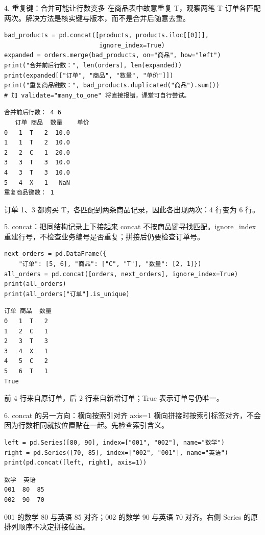 \documentclass[9pt]{ctexbeamer}
\begin{document}
\begin{frame}[fragile]{4. 重复键：合并可能让行数变多}
\small 在商品表中故意重复 T，观察两笔 T 订单各匹配两次。解决方法是核实键与版本，而不是合并后随意去重。
\medskip
\begin{lstlisting}[basicstyle=\ttfamily\scriptsize]
bad_products = pd.concat([products, products.iloc[[0]]],
                          ignore_index=True)
expanded = orders.merge(bad_products, on="商品", how="left")
print("合并前后行数：", len(orders), len(expanded))
print(expanded[["订单", "商品", "数量", "单价"]])
print("重复商品键数：", bad_products.duplicated("商品").sum())
# 加 validate="many_to_one" 将直接报错，课堂可自行尝试。
\end{lstlisting}
\begin{lstlisting}[language={},numbers=none,basicstyle=\ttfamily\scriptsize]
合并前后行数： 4 6
   订单 商品  数量    单价
0   1  T   2  10.0
1   1  T   2  10.0
2   2  C   1  20.0
3   3  T   3  10.0
4   3  T   3  10.0
5   4  X   1   NaN
重复商品键数： 1
\end{lstlisting}
\small 订单 1、3 都购买 T，各匹配到两条商品记录，因此各出现两次：4 行变为 6 行。
\end{frame}

\begin{frame}[fragile]{5. concat：把同结构记录上下接起来}
\small concat 不按商品键寻找匹配。ignore\_index 重建行号，不检查业务编号是否重复；拼接后仍要检查订单号。
\medskip
\begin{lstlisting}[basicstyle=\ttfamily\scriptsize]
next_orders = pd.DataFrame({
    "订单": [5, 6], "商品": ["C", "T"], "数量": [2, 1]})
all_orders = pd.concat([orders, next_orders], ignore_index=True)
print(all_orders)
print(all_orders["订单"].is_unique)
\end{lstlisting}
\begin{lstlisting}[language={},numbers=none,basicstyle=\ttfamily\scriptsize]
   订单 商品  数量
0   1  T   2
1   2  C   1
2   3  T   3
3   4  X   1
4   5  C   2
5   6  T   1
True
\end{lstlisting}
\small 前 4 行来自原订单，后 2 行来自新增订单；True 表示订单号仍唯一。
\end{frame}

\begin{frame}[fragile]{6. concat 的另一方向：横向按索引对齐}
\small axis=1 横向拼接时按索引标签对齐，不会因为行数相同就按位置贴在一起。先检查索引含义。
\medskip
\begin{lstlisting}[basicstyle=\ttfamily\scriptsize]
left = pd.Series([80, 90], index=["001", "002"], name="数学")
right = pd.Series([70, 85], index=["002", "001"], name="英语")
print(pd.concat([left, right], axis=1))
\end{lstlisting}
\begin{lstlisting}[language={},numbers=none,basicstyle=\ttfamily\scriptsize]
     数学  英语
001  80  85
002  90  70
\end{lstlisting}
\small 001 的数学 80 与英语 85 对齐；002 的数学 90 与英语 70 对齐。右侧 Series 的原排列顺序不决定拼接位置。
\end{frame}
\end{document}
